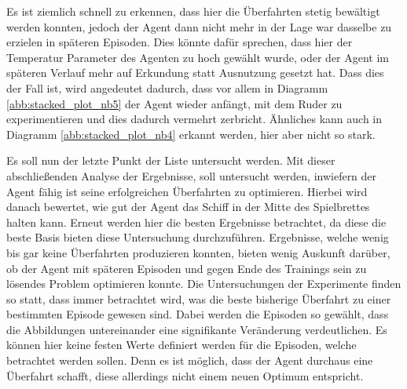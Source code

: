 \documentclass[]{iat}
\begin{document}
Es ist ziemlich schnell zu erkennen, dass hier die Überfahrten stetig bewältigt werden konnten, jedoch der Agent dann nicht mehr in der Lage war dasselbe zu erzielen in späteren Episoden. Dies könnte dafür sprechen, dass hier der Temperatur Parameter des Agenten zu hoch gewählt wurde, oder der Agent im späteren Verlauf mehr auf Erkundung statt Ausnutzung gesetzt hat. Dass dies der Fall ist, wird angedeutet dadurch, dass vor allem in Diagramm \ref{abb:stacked_plot_nb5} der Agent wieder anfängt, mit dem Ruder zu experimentieren und dies dadurch vermehrt zerbricht. Ähnliches kann auch in Diagramm \ref{abb:stacked_plot_nb4} erkannt werden, hier aber nicht so stark.

Es soll nun der letzte Punkt der Liste untersucht werden. Mit dieser abschließenden Analyse der Ergebnisse, soll untersucht werden, inwiefern der Agent fähig ist seine erfolgreichen Überfahrten zu optimieren. Hierbei wird danach bewertet, wie gut der Agent das Schiff in der Mitte des Spielbrettes halten kann. Erneut werden hier die besten Ergebnisse betrachtet, da diese die beste Basis bieten diese Untersuchung durchzuführen. Ergebnisse, welche wenig bis gar keine Überfahrten produzieren konnten, bieten wenig Auskunft darüber, ob der Agent mit späteren Episoden und gegen Ende des Trainings sein zu lösendes Problem optimieren konnte. Die Untersuchungen der Experimente finden so statt, dass immer betrachtet wird, was die beste bisherige Überfahrt zu einer bestimmten Episode gewesen sind. Dabei werden die Episoden so gewählt, dass die Abbildungen untereinander eine signifikante Veränderung verdeutlichen. Es können hier keine festen Werte definiert werden für die Episoden, welche betrachtet werden sollen. Denn es ist möglich, dass der Agent durchaus eine Überfahrt schafft, diese allerdings nicht einem neuen Optimum entspricht.
\end{document}
